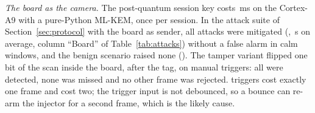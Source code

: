 \textit{The board as the camera.} The post-quantum session key costs \BdKexMs\,ms on the Cortex-A9 with a pure-Python ML-KEM, once per session. In the attack suite of Section~\ref{sec:protocol} with the board as sender, all attacks were mitigated (\BdSuiteMit, \BdTtmMean\,s on average, column ``Board'' of Table~\ref{tab:attacks}) without a false alarm in \BdSuiteFalse{} calm windows, and the benign scenario raised none (\BdBenignFalse). The tamper variant flipped one bit of the scan inside the board, after the tag, on \BdTamperShots{} manual triggers: all were detected, none was missed and no other frame was rejected. \BdTamperOneFrame{} triggers cost exactly one frame and \BdTamperTwoFrames{} cost two; the trigger input is not debounced, so a bounce can re-arm the injector for a second frame, which is the likely cause.
